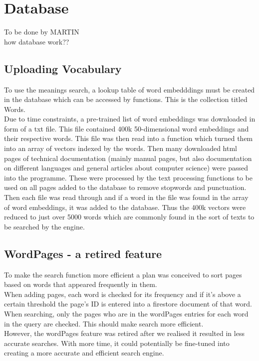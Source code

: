\section{Database}
To be done by MARTIN \\
how database work??
\subsection{Uploading Vocabulary}
To use the meanings search, a lookup table of word embedddings must be created in the database which can be accessed by functions. This is the collection titled Words. \\
Due to time constraints, a pre-trained list of word embeddings was downloaded in form of a txt file. This file contained 400k 50-dimensional word embeddings and their respective words. 
This file was then read into a function which turned them into an array of vectors indexed by the words. Then many downloaded html pages of technical documentation (mainly manual pages, but also documentation on different languages and general articles about computer science) were passed into the programme. These were processed by the text processing functions to be used on all pages added to the database to remove stopwords and punctuation. Then each file was read through and if a word in the file was found in the array of word embeddings, it was added to the database. Thus the 400k vectors were reduced to just over 5000 words which are commonly found in the sort of texts to be searched by the engine.    

\subsection{WordPages - a retired feature}
To make the search function more efficient a plan was conceived to sort pages based on words that appeared frequently in them. \\
When adding pages, each word is checked for its frequency and if it's above a certain threshold the page's ID is entered into a firestore document of that word. \\
When searching, only the pages who are in the wordPages entries for each word in the query are checked. This should make search more efficient. \\
However, the wordPages feature was retired after we realised it resulted in less accurate searches. With more time, it could potentially be fine-tuned into creating a more accurate and efficient search engine. 
